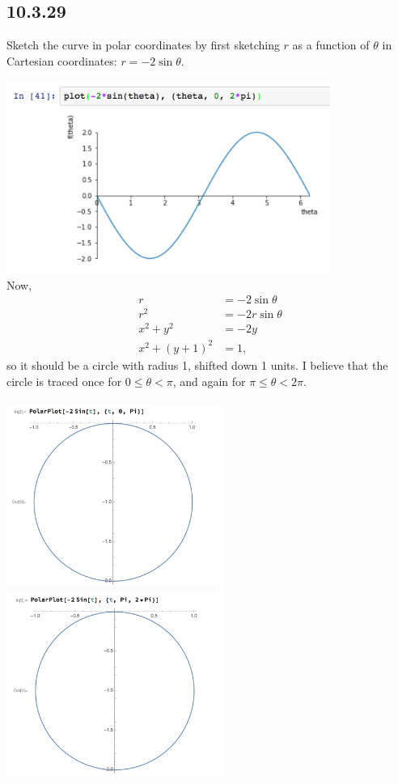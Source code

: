 \documentclass[12pt]{article}
\begin{document}
\subsection*{10.3.29}
Sketch the curve in polar coordinates by first sketching $r$ as a function of
$\theta$ in Cartesian coordinates: $r = -2\sin\theta$.
\begin{mdframed}
  \includegraphics[width=300pt]{img/10-3-29-1.png}\\
  Now,
  \begin{align*}
    r &= -2\sin\theta\\
    r^2 &= -2r\sin\theta\\
    x^2 + y^2 &= -2y\\
    x^2 + (y+1)^2 &= 1,
  \end{align*}
  so it should be a circle with radius 1, shifted down 1 units. I believe that
  the circle is traced once for $0 \leq \theta < \pi$, and again for
  $\pi \leq \theta < 2\pi$.\\\\
  \includegraphics[width=200pt]{img/10-3-29-2.png}
  \includegraphics[width=200pt]{img/10-3-29-3.png}
  \\
\end{mdframed}
\end{document}
